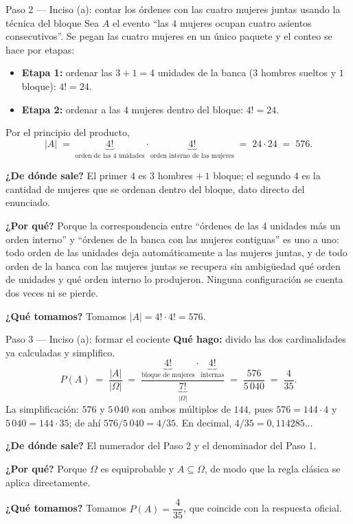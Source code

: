 \documentclass[11pt]{article}
\begin{document}
\begin{sol}
\begin{paso}{Paso 2 --- Inciso (a): contar los \'ordenes con las cuatro mujeres juntas usando la t\'ecnica del bloque}
Sea $A$ el evento ``las $4$ mujeres ocupan cuatro asientos consecutivos''. Se pegan las cuatro mujeres en un \'unico paquete y el conteo se hace por etapas:
\begin{itemize}[leftmargin=*]
  \item \textbf{Etapa 1:} ordenar las $3+1=4$ unidades de la banca ($3$ hombres sueltos y $1$ bloque): $4!=24$.
  \item \textbf{Etapa 2:} ordenar a las $4$ mujeres dentro del bloque: $4!=24$.
\end{itemize}
Por el principio del producto,
\[
|A| \;=\; \underbrace{4!}_{\text{orden de las 4 unidades}}\cdot \underbrace{4!}_{\text{orden interno de las mujeres}} \;=\; 24\cdot 24 \;=\; 576 .
\]

\textbf{¿De d\'onde sale?} El primer $4$ es $3$ hombres $+\,1$ bloque; el segundo $4$ es la cantidad de mujeres que se ordenan dentro del bloque, dato directo del enunciado.

\textbf{¿Por qu\'e?} Porque la correspondencia entre ``\'ordenes de las $4$ unidades m\'as un orden interno'' y ``\'ordenes de la banca con las mujeres contiguas'' es uno a uno: todo orden de las unidades deja autom\'aticamente a las mujeres juntas, y de todo orden de la banca con las mujeres juntas se recupera sin ambig\"uedad qu\'e orden de unidades y qu\'e orden interno lo produjeron. Ninguna configuraci\'on se cuenta dos veces ni se pierde.

\textbf{¿Qu\'e tomamos?} Tomamos $|A|=4!\cdot 4!=576$.
\end{paso}

\begin{paso}{Paso 3 --- Inciso (a): formar el cociente}
\textbf{Qu\'e hago:} divido las dos cardinalidades ya calculadas y simplifico.
\[
P(A)\;=\;\frac{|A|}{|\Omega|}
\;=\;\frac{\underbrace{4!}_{\text{bloque de mujeres}}\cdot\underbrace{4!}_{\text{internas}}}{\underbrace{7!}_{|\Omega|}}
\;=\;\frac{576}{5\,040}\;=\;\frac{4}{35}.
\]
La simplificaci\'on: $576$ y $5\,040$ son ambos m\'ultiplos de $144$, pues $576=144\cdot 4$ y $5\,040=144\cdot 35$; de ah\'i $576/5\,040=4/35$. En decimal, $4/35=0{,}114285\ldots$

\textbf{¿De d\'onde sale?} El numerador del Paso 2 y el denominador del Paso 1.

\textbf{¿Por qu\'e?} Porque $\Omega$ es equiprobable y $A\subseteq\Omega$, de modo que la regla cl\'asica se aplica directamente.

\textbf{¿Qu\'e tomamos?} Tomamos $P(A)=\dfrac{4}{35}$, que coincide con la respuesta oficial.
\end{paso}


\end{sol}
\end{document}
